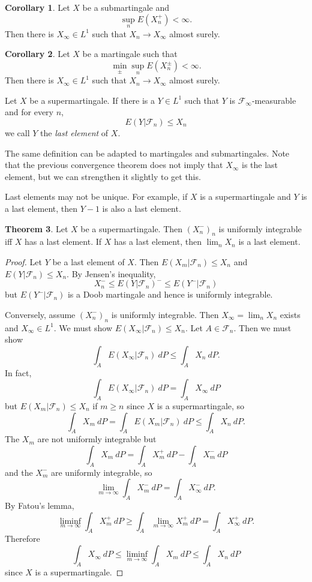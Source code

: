 \documentclass[12pt]{book}
\newcommand{\dfn}[1]{\emph{#1}\index{#1}}
\theoremstyle{definition}
\newtheorem{theorem}{Theorem}[chapter]
\newtheorem{corollary}[theorem]{Corollary}
\newenvironment{definition}
  {\pushQED{\qed}\renewcommand{\qedsymbol}{$\diamondsuit$}\definitionx}
  {\popQED\endexamplex}
\begin{document}
\begin{corollary}
Let $X$ be a submartingale and
$$\sup_n E(X_n^+) < \infty.$$
Then there is $X_\infty \in L^1$ such that $X_n \to X_\infty$ almost surely.
\end{corollary}

\begin{corollary}
Let $X$ be a martingale such that
$$\min_\pm \sup_n E(X_n^\pm) < \infty.$$
Then there is $X_\infty \in L^1$ such that $X_n \to X_\infty$ almost surely.
\end{corollary}

\begin{definition}
Let $X$ be a supermartingale.
If there is a $Y \in L^1$ such that $Y$ is $\mathcal F_\infty$-measurable and for every $n$,
$$E(Y|\mathcal F_n) \leq X_n$$
we call $Y$ the \dfn{last element} of $X$.
\end{definition}

The same definition can be adapted to martingales and submartingales.
Note that the previous convergence theorem does not imply that $X_\infty$ is the last element, but we can strengthen it slightly to get this.

Last elements may not be unique.
For example, if $X$ is a supermartingale and $Y$ is a last element, then $Y - 1$ is also a last element.

\begin{theorem}
Let $X$ be a supermartingale. Then $(X_n^-)_n$ is uniformly integrable iff $X$ has a last element.
If $X$ has a last element, then $\lim_n X_n$ is a last element.
\end{theorem}
\begin{proof}
Let $Y$ be a last element of $X$.
Then $E(X_m|\mathcal F_n) \leq X_n$ and $E(Y|\mathcal F_n) \leq X_n$.
By Jensen's inequality,
$$X_n^- \leq E(Y|\mathcal F_n)^- \leq E(Y^-|\mathcal F_n)$$
but $E(Y^-|\mathcal F_n)$ is a Doob martingale and hence is uniformly integrable.

Conversely, assume $(X_n^-)_n$ is uniformly integrable.
Then $X_\infty = \lim_n X_n$ exists and $X_\infty \in L^1$.
We must show $E(X_\infty|\mathcal F_n) \leq X_n$.
Let $A \in \mathcal F_n$. Then we must show
$$\int_A E(X_\infty|\mathcal F_n) ~dP \leq \int_A X_n ~dP.$$
In fact,
$$\int_A E(X_\infty|\mathcal F_n) ~dP = \int_A X_\infty ~dP$$
but $E(X_m|\mathcal F_n) \leq X_n$ if $m \geq n$ since $X$ is a supermartingale, so
$$\int_A X_m ~dP = \int_A E(X_m|\mathcal F_n) ~dP \leq \int_A X_n ~dP.$$
The $X_m$ are not uniformly integrable but
$$\int_A X_m ~dP = \int_A X_m^+ ~dP - \int_A X_m^- ~dP$$
and the $X_m^-$ are uniformly integrable, so
$$\lim_{m \to \infty} \int_A X_m^- ~dP = \int_A X_\infty^- ~dP.$$
By Fatou's lemma,
$$\liminf_{m \to \infty} \int_A X_m^+ ~dP \geq \int_A \lim_{m \to \infty} X_m^+ ~dP = \int_A X_\infty^+ ~dP.$$
Therefore
$$\int_A X_\infty ~dP \leq \liminf_{m \to \infty} \int_A X_m ~dP \leq \int_A X_n ~dP$$
since $X$ is a supermartingale.
\end{proof}
\end{document}
